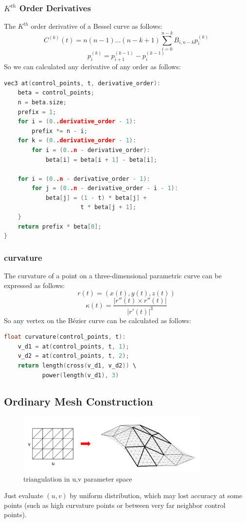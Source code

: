\documentclass[acmtog]{acmart}
\begin{document}
\subsubsection{$K^{th}$ Order Derivatives}
The $K^{th}$ order derivative of a Bessel curve as follows:
$$
C^{(k)}(t) = n(n-1)\dots(n-k+1)\sum_{i=0}^{n-k}B_{i,n-k}p_{i}^{(k)}
$$
$$
p_{i}^{(k)} = p_{i+1}^{(k-1)} - p_{i}^{(k-1)}
$$
So we can calculated any derivative of any order as follows:
\begin{lstlisting}[language=C++]
vec3 at(control_points, t, derivative_order):
    beta = control_points;
    n = beta.size;
    prefix = 1;
    for i = (0..derivative_order - 1):
        prefix *= n - i;
    for k = (0..derivative_order - 1):
        for i = (0..n - derivative_order):
            beta[i] = beta[i + 1] - beta[i];

    for i = (0..n - derivative_order - 1):
        for j = (0..n - derivative_order - i - 1):
            beta[j] = (1 - t) * beta[j] +
                      t * beta[j + 1];
    }
    return prefix * beta[0];
}
\end{lstlisting}
\subsubsection{curvature}
The curvature of a point on a three-dimensional parametric curve can be expressed as follows:
$$
r(t) = (x(t),y(t),z(t))
$$
$$
\kappa(t) = \frac{|r''(t)\times r''(t)|}{|r'(t)|^3}
$$
So any vertex on the Bézier curve can be calculated as follows:
\begin{lstlisting}[language=C++]
float curvature(control_points, t):
    v_d1 = at(control_points, t, 1);
    v_d2 = at(control_points, t, 2);
    return length(cross(v_d1, v_d2)) \
           power(length(v_d1), 3)
\end{lstlisting}
\subsection{Ordinary Mesh Construction}
\begin{figure}[h]
    \centering
    \includegraphics[height = 3.0cm]{ordinary_uv_to_mesh.png}
    \caption{triangulation in u,v parameter space}
\end{figure}
Just evaluate $(u, v)$ by uniform distribution, which may lost accuracy at some points (such as high curvature points or between very far neighbor control points).
\end{document}

